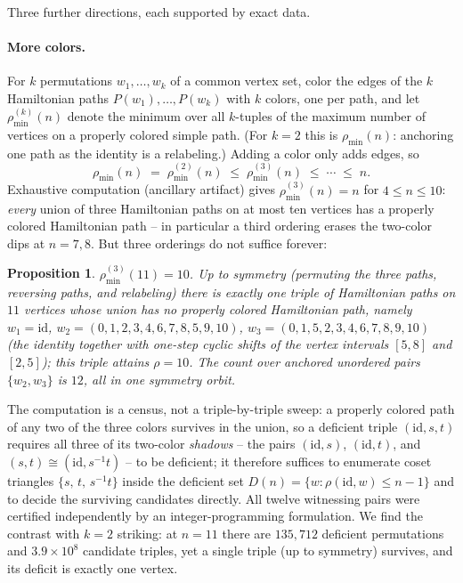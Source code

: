 \documentclass[11pt]{article}
\newtheorem{proposition}[theorem]{Proposition}
\theoremstyle{definition}
\newcommand{\pmin}{\rho_{\min}}
\newcommand{\pminK}[1]{\rho_{\min}^{(#1)}}
\begin{document}
Three further directions, each supported by exact data.

\paragraph{More colors.}
For $k$ permutations $w_1,\dots,w_k$ of a common vertex set, color the edges of
the $k$ Hamiltonian paths $P(w_1),\dots,P(w_k)$ with $k$ colors, one per path,
and let $\pminK{k}(n)$ denote the minimum over all $k$-tuples of the maximum
number of vertices on a properly colored simple path. (For $k=2$ this is
$\pmin(n)$: anchoring one path as the identity is a relabeling.) Adding a color
only adds edges, so
\[
\pmin(n) \;=\; \pminK{2}(n) \;\le\; \pminK{3}(n) \;\le\; \cdots \;\le\; n .
\]
Exhaustive computation (ancillary artifact) gives
$\pminK{3}(n) = n$ for $4 \le n \le 10$: \emph{every} union of three Hamiltonian
paths on at most ten vertices has a properly colored Hamiltonian path -- in
particular a third ordering erases the two-color dips at $n = 7, 8$. But three
orderings do not suffice forever:

\begin{proposition}\label{prop:k3}
$\pminK{3}(11) = 10$. Up to symmetry (permuting the three paths, reversing
paths, and relabeling) there is exactly \emph{one} triple of Hamiltonian paths
on $11$ vertices whose union has no properly colored Hamiltonian path, namely
$w_1 = \mathrm{id}$,
$w_2 = (0,1,2,3,4,6,7,8,5,9,10)$,
$w_3 = (0,1,5,2,3,4,6,7,8,9,10)$
(the identity together with one-step cyclic shifts of the vertex intervals
$[5,8]$ and $[2,5]$); this triple attains $\rho = 10$. The count over anchored
unordered pairs $\{w_2, w_3\}$ is $12$, all in one symmetry orbit.
\end{proposition}

The computation is a census, not a triple-by-triple sweep: a properly colored
path of any two of the three colors survives in the union, so a deficient
triple $(\mathrm{id}, s, t)$ requires all three of its two-color
\emph{shadows} -- the pairs $(\mathrm{id},s)$, $(\mathrm{id},t)$, and
$(s,t) \cong (\mathrm{id}, s^{-1}t)$ -- to be deficient; it therefore suffices
to enumerate coset triangles $\{s,\,t,\,s^{-1}t\}$ inside the deficient set
$D(n) = \{w : \rho(\mathrm{id},w) \le n-1\}$ and to decide the surviving
candidates directly. All twelve witnessing pairs were certified independently
by an integer-programming formulation. We find the contrast with $k = 2$
striking: at $n = 11$ there are $135{,}712$ deficient permutations and
$3.9 \times 10^8$ candidate triples, yet a single triple (up to symmetry)
survives, and its deficit is exactly one vertex.
\end{document}
